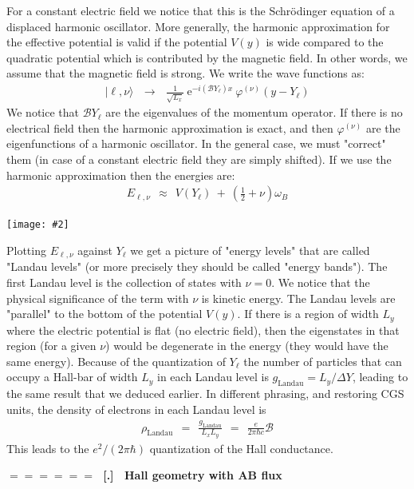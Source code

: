 \documentclass[onecolumn,fleqn]{revtex4}
\newcommand{\eexp}{\mathrm{e}^}
\newcommand{\putgraph}[2][0.30\hsize]{\texttt{[image: \#2]}}
\newcommand{\beq}{\begin{eqnarray}}
\newcommand{\eeq}{\end{eqnarray}}
\renewcommand{\thesubsection}{\arabic{subsection}}
\renewcommand{\thesubsubsection}{\arabic{subsubsection}}
\newcommand{\sheadC}[1]
{
\addtocounter{subsubsection}{1}
\vspace{5mm}
{\Large\bf $=\!=\!=\!=\!=\!=\;$ [\thesubsection.\thesubsubsection] \ #1}  
\nopagebreak
\phantomsection
}
\begin{document}
For a constant electric field we notice that this 
is the Schr\"{o}dinger equation of a displaced 
harmonic oscillator. More generally, the harmonic 
approximation for the effective potential is 
valid if the potential ${V(y)}$ is wide compared 
to the quadratic potential which is contributed 
by the magnetic field. In other words, we assume that 
the magnetic field is strong. We write the wave functions as:
\beq
|\ell,\nu \rangle 
\ \ \ \rightarrow \ \ \ 
\frac{1}{\sqrt{L_x}} \  
\eexp{-i (\mathcal{B}Y_{\ell}) x } \  
\varphi^{(\nu)}(y-Y_{\ell}) 
\eeq
We notice that ${\mathcal{B}Y_{\ell}}$ are 
the eigenvalues of the momentum operator. 
If there is no electrical field then 
the harmonic approximation is exact, 
and then ${\varphi^{(\nu)}}$ are the 
eigenfunctions of a harmonic oscillator. 
In the general case, we must "correct" them
(in case of a constant electric field 
they are simply shifted). 
If we use the harmonic approximation 
then the energies are:
\beq
E_{\ell,\nu} \ \ \approx \ \ V( Y_{\ell} ) \ + \ \left( \frac{1}{2} + \nu \right) \omega_B 
\eeq




\begin{center}
\putgraph[0.6\hsize]{LandauLevels} 
\end{center}


Plotting $E_{\ell,\nu}$ against $Y_{\ell}$ 
we get a picture of "energy levels" that 
are called "Landau levels" (or more precisely they 
should be called "energy bands"). 
The first Landau level is the collection of states with ${\nu=0}$. 
We notice that the physical significance of the term 
with ${\nu}$ is kinetic energy. The Landau levels 
are "parallel" to the bottom of the potential ${V(y)}$. 
If there is a region of width ${L_y}$ where the electric potential 
is flat (no electric field), then the eigenstates 
in that region (for a given ${\nu}$) would be degenerate 
in the energy (they would have the same energy). 
Because of the quantization of $Y_{\ell}$  
the number of particles that can occupy a Hall-bar of 
width ${ L_y }$ in each Landau level 
is $g_{\text{Landau}}=L_y/\Delta Y$, 
leading to the same result that we deduced earlier.   
In different phrasing, and restoring CGS units, 
the density of electrons in each Landau level is 
\beq
\rho_{\text{Landau}} \ \ = \ \ \frac{g_{\text{Landau}}}{L_xL_y}
\ \ = \ \ \frac{e}{2\pi\hbar c}\mathcal{B} 
\eeq
This leads to the $e^2/(2\pi\hbar)$ quantization of the Hall conductance. 


\sheadC{Hall geometry with AB flux}
\end{document}
